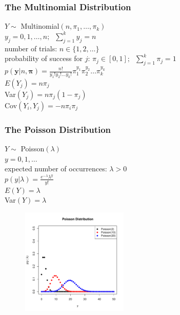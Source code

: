 \documentclass{beamer}
\begin{document}
\begin{frame}
\frametitle{The Multinomial Distribution}
\pause
$Y \sim$ Multinomial$(n,\pi_1, \dots, \pi_k)$\\
\bigskip
\pause
$y_j = 0,1,\dots,n; \; \; \sum_{j=1}^k y_j = n$\\
\bigskip
\pause
number of trials: $n \in \{1,2,\dots \}$\\
\pause
probability of success for $j$: $\pi_j \in [0,1]; \; \; \sum_{j=1}^k
\pi_j = 1$\\
\bigskip
\pause
$p(\mathbf{y}|n,\bm{\pi}) = \frac{n!}{y_1! y_2! \dots
y_k!}\pi_1^{y_1}\pi_2^{y_2} \dots \pi_k ^ {y_k}$\\
\bigskip
\bigskip
\pause
$E(Y_j) = n\pi_j$\\
\bigskip
\pause
Var$(Y_j) = n \pi_j (1 - \pi_j)$\\
\bigskip
\pause
Cov$(Y_i, Y_j) = -n \pi_i \pi_j$


\end{frame}



\begin{frame}
\frametitle{The Poisson Distribution}
\begin{multicols}{2}
\pause
$Y \sim$ Poisson$(\lambda)$\\
\bigskip
\pause
$y = 0,1,\dots$\\
\bigskip
\pause
expected number of occurrences: $\lambda > 0$\\
\bigskip
\pause
$p(y|\lambda) = \frac{e^{-\lambda} \lambda^y}{y!}$\\
\bigskip
\bigskip
\pause
$E(Y) = \lambda$\\
\bigskip
\pause
Var$(Y) = \lambda$
\pause


\begin{figure}[!htp]
\begin{center}
\includegraphics[width=2in, height=2in]{probability-poisson.pdf}
\end{center}
\end{figure}
\end{multicols}
\end{frame}
\end{document}
